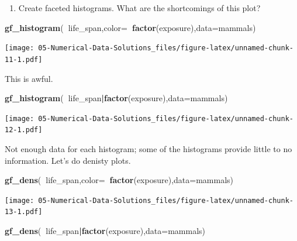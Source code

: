 \documentclass[
]{book}
\newenvironment{Shaded}{\begin{snugshade}}{\end{snugshade}}
\newcommand{\DataTypeTok}[1]{\textcolor[rgb]{0.13,0.29,0.53}{#1}}
\newcommand{\KeywordTok}[1]{\textcolor[rgb]{0.13,0.29,0.53}{\textbf{#1}}}
\newcommand{\NormalTok}[1]{#1}
\newcommand{\OperatorTok}[1]{\textcolor[rgb]{0.81,0.36,0.00}{\textbf{#1}}}
\providecommand{\tightlist}{%
  \setlength{\itemsep}{0pt}\setlength{\parskip}{0pt}}
\begin{document}
\begin{enumerate}
\def\labelenumi{\alph{enumi}.}
\setcounter{enumi}{2}
\tightlist
\item
  Create faceted histograms. What are the shortcomings of this plot?
\end{enumerate}

\begin{Shaded}
\begin{Highlighting}[]
\KeywordTok{gf_histogram}\NormalTok{(}\OperatorTok{~}\NormalTok{life_span,}\DataTypeTok{color=}\OperatorTok{~}\KeywordTok{factor}\NormalTok{(exposure),}\DataTypeTok{data=}\NormalTok{mammals)}
\end{Highlighting}
\end{Shaded}

\texttt{[image: 05-Numerical-Data-Solutions\_files/figure-latex/unnamed-chunk-11-1.pdf]}

This is awful.

\begin{Shaded}
\begin{Highlighting}[]
\KeywordTok{gf_histogram}\NormalTok{(}\OperatorTok{~}\NormalTok{life_span}\OperatorTok{|}\KeywordTok{factor}\NormalTok{(exposure),}\DataTypeTok{data=}\NormalTok{mammals)}
\end{Highlighting}
\end{Shaded}

\texttt{[image: 05-Numerical-Data-Solutions\_files/figure-latex/unnamed-chunk-12-1.pdf]}

Not enough data for each histogram; some of the histograms provide little to no information. Let's do denisty plots.

\begin{Shaded}
\begin{Highlighting}[]
\KeywordTok{gf_dens}\NormalTok{(}\OperatorTok{~}\NormalTok{life_span,}\DataTypeTok{color=}\OperatorTok{~}\KeywordTok{factor}\NormalTok{(exposure),}\DataTypeTok{data=}\NormalTok{mammals)}
\end{Highlighting}
\end{Shaded}

\texttt{[image: 05-Numerical-Data-Solutions\_files/figure-latex/unnamed-chunk-13-1.pdf]}

\begin{Shaded}
\begin{Highlighting}[]
\KeywordTok{gf_dens}\NormalTok{(}\OperatorTok{~}\NormalTok{life_span}\OperatorTok{|}\KeywordTok{factor}\NormalTok{(exposure),}\DataTypeTok{data=}\NormalTok{mammals)}
\end{Highlighting}
\end{Shaded}
\end{document}
